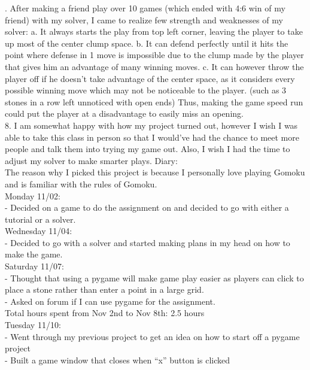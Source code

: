 \documentclass[a4paper]{article}
\begin{document}
.	After making a friend play over 10 games (which ended with 4:6 win of my friend) with my solver, I came to realize few strength and weaknesses of my solver:
	a.	It always starts the play from top left corner, leaving the player to take up most of the center clump space.
	b.	It can defend perfectly until it hits the point where defense in 1 move is impossible due to the clump made by the player that gives him an advantage of many winning moves.
	c.	It can however throw the player off if he doesn’t take advantage of the center space, as it considers every possible winning move which may not be noticeable to the player. (such as 3 stones in a row left unnoticed with open ends) Thus, making the game speed run could put the player at a disadvantage to easily miss an opening.
\\
8. I am somewhat happy with how my project turned out, however I wish I was able to take this class in person so that I would've had the chance to meet more people and talk them into trying my game out. Also, I wish I had the time to adjust my solver to make smarter plays.
\newpage
\noindent Diary:\\
The reason why I picked this project is because I personally love playing Gomoku and is familiar with the rules of Gomoku.\\
\newline
Monday 11/02:\\
\indent -	Decided on a game to do the assignment on and decided to go with either a tutorial or a solver.\\
Wednesday 11/04:\\
\indent -	Decided to go with a solver and started making plans in my head on how to make the game.\\
Saturday 11/07:\\
\indent -	Thought that using a pygame will make game play easier as players can click to place a stone rather than enter a point in a large grid.\\
\indent -	Asked on forum if I can use pygame for the assignment.
\newline\\
Total hours spent from Nov 2nd to Nov 8th: 2.5 hours
\newline\\
Tuesday 11/10:\\
\indent -	Went through my previous project to get an idea on how to start off a pygame project\\
\indent -	Built a game window that closes when “x” button is clicked\\
\end{document}
